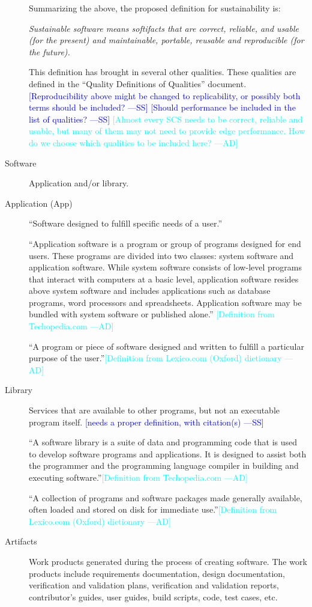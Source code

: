 \documentclass[12pt]{article}
\newcommand{\authornote}[3]{\textcolor{#1}{[#3 ---#2]}}
\newcommand{\authornote}[3]{}
\newcommand{\wss}[1]{\authornote{blue}{SS}{#1}} %
\newcommand{\ad}[1]{\authornote{cyan}{AD}{#1}} %
\begin{document}
\begin{description}
  Summarizing the above, the proposed definition for sustainability is:

  \emph{Sustainable software means softifacts that are correct,
    reliable, and usable (for the present) and maintainable, portable, reusable
    and reproducible (for the future).}

This definition has brought in several other qualities.  These qualities are
defined in the ``Quality  Definitions of Qualities'' document.
\wss{Reproducibility above might be changed to replicability, or possibly both
  terms should be included?}
\wss{Should performance be included in the list of qualities?}
\ad{Almost every SCS needs to be correct, reliable and usable, but many of them
may not need to provide edge performance. How do we choose which qualities to be
included here?}

\item[Software] Application and/or library.
\item[Application (App)] ``Software designed to fulfill specific needs of a
  user.'' \citep{IEEEStdGlossarySET1990}

``Application software is a program or group of programs designed for end users.
These programs are divided into two classes: system software and application
software. While system software consists of low-level programs that interact
with computers at a basic level, application software resides above system
software and includes applications such as database programs, word processors
and spreadsheets. Application software may be bundled with system software or
published alone.''\citep{TechopediaApplication2018} \ad{Definition from
Techopedia.com}

``A program or piece of software designed and written to fulfill a particular
purpose of the user.''\citep{OxfordApplication2020}\ad{Definition from
Lexico.com (Oxford) dictionary}

\item[Library] Services that are available to other programs, but not an
  executable program itself. \wss{needs a
    proper definition, with citation(s)}

``A software library is a suite of data and programming code that is used to
develop software programs and applications. It is designed to assist both the
programmer and the programming language compiler in building and executing
software.''\citep{TechopediaLibrary2016}\ad{Definition from Techopedia.com}

``A collection of programs and software packages made generally available, often
loaded and stored on disk for immediate
use.''\citep{OxfordLibrary2020}\ad{Definition from Lexico.com (Oxford)
dictionary}

\item[Artifacts] Work products generated during the process of creating
  software.  The work products include requirements documentation, design
  documentation, verification and validation plans, verification and validation
  reports, contributor's guides, user guides, build scripts, code, test cases,
  etc.
\end{description}
\end{document}
